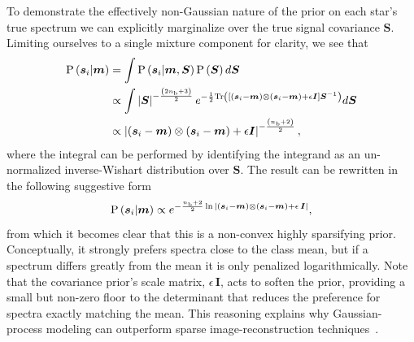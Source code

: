 \documentclass[a4paper,fleqn,usenatbib]{mnras}
\newcommand{\nb}{n_{\rm b}}
\newcommand{\prob}{{\rm P}}
\newcommand{\specmean}{{\bm m}}
\newcommand{\speccov}{{\bm S}}
\newcommand{\objspec}{{\bm s}}
\newcommand{\identity}{{\bm I}}
\begin{document}
To demonstrate the effectively non-Gaussian nature of the prior on each star's true spectrum we can explicitly marginalize over the true signal covariance $\speccov$. Limiting ourselves to a single mixture component for clarity, we see that
\begin{align}
\prob\left(\objspec_i|\specmean\right) & = 
\int
	\prob\left(\objspec_i|\specmean,\speccov\right)
	\prob\left(\speccov\right)
d\speccov \nonumber \\
& \propto \int
	\left| \speccov \right|^{-\frac{\left( 2\nb+3 \right)}{2}}
	e^{-\frac{1}{2} {\rm Tr}\left( \left[ \left(\objspec_i-\specmean \right) \otimes \left(\objspec_i-\specmean \right) + \epsilon \identity \right]  \speccov^{-1} \right)}
d\speccov \nonumber \\
& \propto \left| \left(\objspec_i-\specmean \right) \otimes \left(\objspec_i-\specmean \right) + \epsilon \identity \right|^{-\frac{\left( \nb+2 \right)}{2}},
\end{align}
where the integral can be performed by identifying the integrand as an un-normalized inverse-Wishart distribution over $\speccov$. The result can be rewritten in the following suggestive form
\begin{equation}
\prob\left(\objspec_i|\specmean\right) \propto 
e^{-\frac{\nb + 2}{2} \ln{ \left| \left(\objspec_i-\specmean \right) \otimes \left(\objspec_i-\specmean \right) + \epsilon \, \identity \right|}},
\end{equation}
from which it becomes clear that this is a non-convex highly sparsifying prior. Conceptually, it strongly prefers spectra close to the class mean, but if a spectrum differs greatly from the mean it is only penalized logarithmically. Note that the covariance prior's scale matrix, $\epsilon \, \identity$, acts to soften the prior, providing a small but non-zero floor to the determinant that reduces the preference for spectra exactly matching the mean. This reasoning explains why Gaussian-process modeling can outperform sparse image-reconstruction techniques~\citep{Sutter_etal:2014}.
\end{document}
